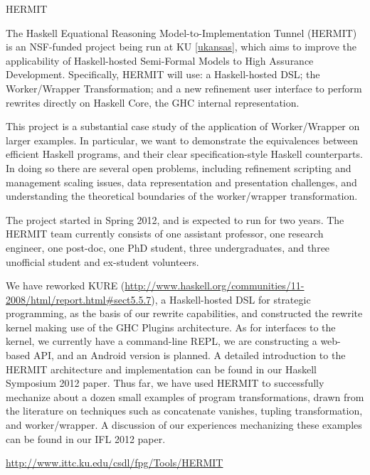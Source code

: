 \begin{hcarentry}[updated]{HERMIT}
\label{HERMIT}
\makeheader

The Haskell Equational Reasoning Model-to-Implementation Tunnel
(HERMIT) is an NSF-funded project being run at KU \cref{ukansas}, which aims to improve the
applicability of Haskell-hosted Semi-Formal Models to High Assurance Development.
Specifically, HERMIT will use: a Haskell-hosted DSL; the Worker/Wrapper Transformation;
and a new refinement user interface to perform rewrites directly on Haskell Core, the GHC internal representation.

This project is a substantial case study of the application of
Worker/Wrapper on larger examples. In particular, we want to
demonstrate the equivalences between efficient Haskell programs, and
their clear specification-style Haskell counterparts. In doing so
there are several open problems, including refinement scripting and
management scaling issues, data representation and presentation
challenges, and understanding the theoretical boundaries of the
worker/wrapper transformation.

The project started in Spring 2012, and is expected to run for two years.
The HERMIT team currently consists of
one assistant professor, %
one research engineer, %
one post-doc, %
one PhD student, %
three undergraduates, %
and three unofficial student and ex-student volunteers. %
%
%

We have reworked KURE (\url{http://www.haskell.org/communities/11-2008/html/report.html#sect5.5.7}), a Haskell-hosted DSL for strategic programming, as the basis of our rewrite capabilities, and constructed the rewrite kernel making use of the GHC Plugins architecture.
As for interfaces to the kernel, we currently have a command-line REPL, we are constructing a web-based API, and an Android version is planned.
A detailed introduction to the HERMIT architecture and implementation can be found in our Haskell Symposium 2012 paper.
Thus far, we have used HERMIT to successfully mechanize about a dozen small examples of program transformations, drawn from the literature on techniques such as concatenate vanishes, tupling transformation, and worker/wrapper.
A discussion of our experiences mechanizing these examples can be found in our IFL 2012 paper.

\FurtherReading
  \url{http://www.ittc.ku.edu/csdl/fpg/Tools/HERMIT}
\end{hcarentry}
